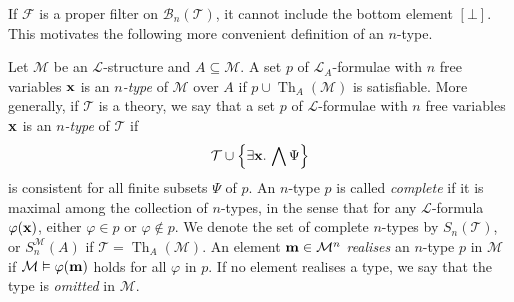 \begin{remark}
    If \( \mathcal F \) is a proper filter on \( \mathcal B_n(\mathcal T) \), it cannot include the bottom element \( [\bot] \).
    This motivates the following more convenient definition of an \( n \)-type.
\end{remark}
\begin{definition}
    Let \( \mathcal M \) be an \( \mathcal L \)-structure and \( A \subseteq \mathcal M \).
    A set \( p \) of \( \mathcal L_A \)-formulae with \( n \) free variables \( \vb x \) is an \emph{\( n \)-type} of \( \mathcal M \) over \( A \) if \( p \cup \operatorname{Th}_A(\mathcal M) \) is satisfiable.
    More generally, if \( \mathcal T \) is a theory, we say that a set \( p \) of \( \mathcal L \)-formulae with \( n \) free variables \( \vb x \) is an \emph{\( n \)-type} of \( \mathcal T \) if
    \[ \mathcal T \cup \qty{\exists \vb x.\, \bigwedge \Psi} \]
    is consistent for all finite subsets \( \Psi \) of \( p \).
    An \( n \)-type \( p \) is called \emph{complete} if it is maximal among the collection of \( n \)-types, in the sense that for any \( \mathcal L \)-formula \( \varphi(\vb x) \), either \( \varphi \in p \) or \( \varphi \notin p \).
    We denote the set of complete \( n \)-types by \( S_n(\mathcal T) \), or \( S_n^{\mathcal M}(A) \) if \( \mathcal T = \operatorname{Th}_A(\mathcal M) \).
    An element \( \vb m \in \mathcal M^n \) \emph{realises} an \( n \)-type \( p \) in \( \mathcal M \) if \( \mathcal M \vDash \varphi(\vb m) \) holds for all \( \varphi \) in \( p \).
    If no element realises a type, we say that the type is \emph{omitted} in \( \mathcal M \).
\end{definition}
